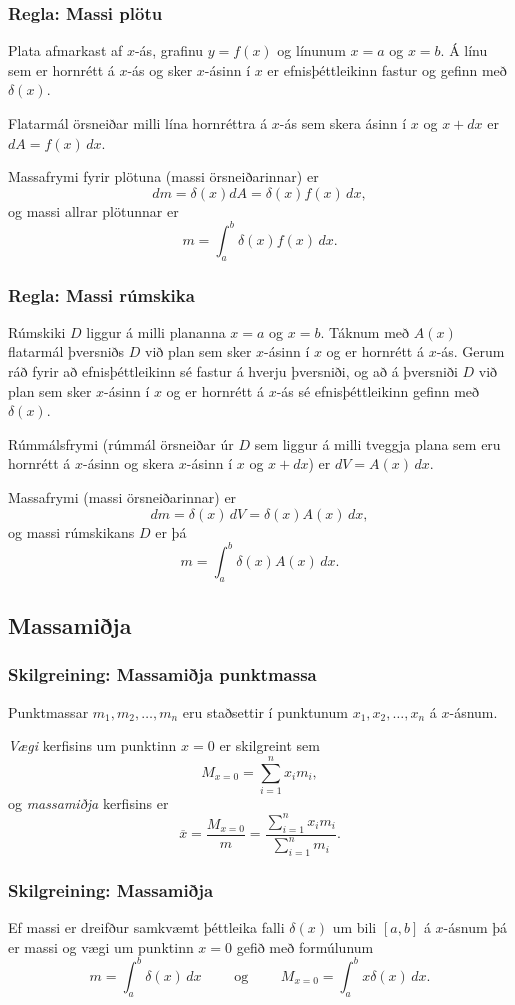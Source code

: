 \documentclass[icelandic,a4paper,12pt]{article}
\begin{document}
\subsubsection{Regla: Massi plötu}  
Plata afmarkast af $x$-ás, grafinu $y=f(x)$ og línunum $x=a$ og $x=b$.  
Á línu sem er hornrétt á $x$-ás og sker $x$-ásinn í
$x$ er efnisþéttleikinn fastur og gefinn með $\delta(x)$.  


Flatarmál örsneiðar milli lína hornréttra á $x$-ás sem skera ásinn í 
$x$ og $x+dx$ er $dA=f(x)\,dx$.  

Massafrymi fyrir plötuna (massi örsneiðarinnar) er
$$
  dm =\delta(x)dA = \delta(x) f(x)\,dx,
$$
og massi allrar plötunnar er
$$m=\int_a^b \delta(x)f(x)\,dx.$$

\subsubsection{Regla: Massi rúmskika} 
Rúmskiki $D$ liggur á milli plananna $x=a$ og $x=b$.  
Táknum með $A(x)$ flatarmál þversniðs $D$ við plan sem sker $x$-ásinn í $x$ og er 
hornrétt á $x$-ás. 
Gerum ráð fyrir að efnisþéttleikinn sé fastur á hverju þversniði,
og að á þversniði $D$ við plan sem sker $x$-ásinn í $x$ og er 
hornrétt á $x$-ás sé efnisþéttleikinn gefinn með $\delta(x)$.  

Rúmmálsfrymi (rúmmál örsneiðar úr $D$ sem liggur á milli tveggja plana sem eru 
hornrétt á $x$-ásinn og skera
$x$-ásinn í $x$ og $x+dx$)  er $dV=A(x)\, dx$.

Massafrymi (massi örsneiðarinnar) er
$$dm=\delta(x)\, dV = \delta(x) A(x)\, dx,$$
og massi rúmskikans $D$ er þá
$$m=\int_a^b \delta(x)A(x)\, dx.$$

\subsection{Massamiðja}
\subsubsection{Skilgreining: Massamiðja punktmassa}
Punktmassar $m_1, m_2, \ldots, m_n$ eru staðsettir í punktunum $x_1,
x_2, \ldots, x_n$ á $x$-ásnum. 

\emph{Vægi} kerfisins um punktinn $x=0$ er skilgreint sem 
$$M_{x=0}=\sum_{i=1}^n x_im_i,$$ 
og \emph{massamiðja} kerfisins er  
$$\overline{x}=\frac{M_{x=0}}{m} = \frac{\sum_{i=1}^n x_im_i}{\sum_{i=1}^n m_i}.$$

\subsubsection{Skilgreining: Massamiðja}
Ef massi er dreifður samkvæmt þéttleika falli $\delta(x)$ um bili $[a, b]$ á $x$-ásnum  
þá er massi og vægi um punktinn $x=0$ gefið með formúlunum  
$$
m=\int_a^b \delta(x)\,dx 
\qquad\mbox{ og }\qquad 
M_{x=0}= \int_a^b x\delta(x)\,dx.
$$
 
\end{document}
